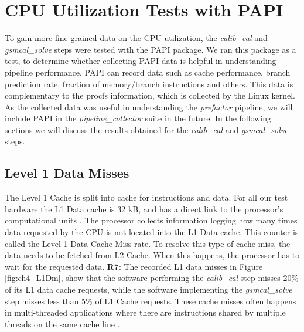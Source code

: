\section{CPU Utilization Tests with PAPI}\label{sec:ch4_PAPI}

To gain more fine grained data on the CPU utilization, the \textit{calib\_cal} and \textit{gsmcal\_solve} steps were tested with the PAPI package.  We ran this package as a test, to determine whether collecting PAPI data is helpful in understanding pipeline performance.  PAPI can record data such as cache performance, branch prediction rate, fraction of memory/branch instructions and others. This data is complementary to the procfs information, which is collected by the Linux kernel. As the collected data was useful in understanding the \textit{prefactor} pipeline, we will include PAPI in the \textit{pipeline\_collector} suite in the future. In the following sections we will discuss the results obtained for the \textit{calib\_cal} and \textit{gsmcal\_solve} steps.

\subsection{Level 1 Data Misses}

The Level 1 Cache is split into cache for instructions and data. For all our test hardware the L1 Data cache is 32 kB, and has a direct link to the processor's computational units \citep{haswell}. The processor collects information logging how many times data requested by the CPU is not located into the L1 Data cache. This counter is called the Level 1 Data Cache Miss rate. To resolve this type of cache miss, the data needs to be fetched from L2 Cache. When this happens, the processor has to wait for the requested data. \textbf{R7}: The recorded L1 data misses in Figure \ref{fig:ch4_L1Dm}, show that the software performing the \textit{calib\_cal} step  misses 20\% of its L1 data cache requests, while the software implementing the \textit{gsmcal\_solve} step misses less than 5\% of L1 Cache requests. These cache misses often happens in multi-threaded applications where there are instructions shared by multiple threads on the same cache line \citep{cache_opt}. 

